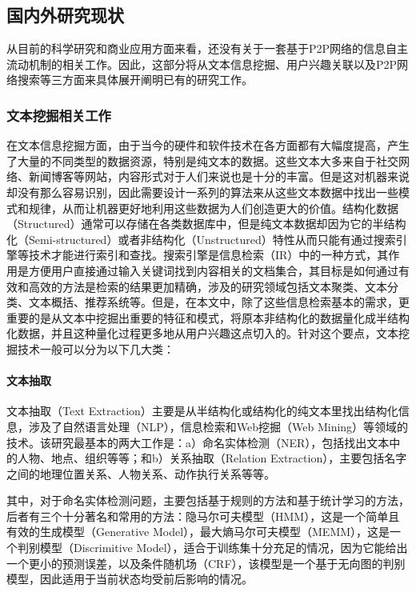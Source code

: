 \subsection{国内外研究现状}
从目前的科学研究和商业应用方面来看，还没有关于一套基于P2P网络的信息自主流动机制的相关工作。因此，这部分将从文本信息挖掘、用户兴趣关联以及P2P网络搜索等三方面来具体展开阐明已有的研究工作。

\subsubsection{文本挖掘相关工作}
在文本信息挖掘方面，由于当今的硬件和软件技术在各方面都有大幅度提高，产生了大量的不同类型的数据资源\cite{han2006data}，特别是纯文本的数据。这些文本大多来自于社交网络、新闻博客等网站，内容形式对于人们来说也是十分的丰富。但是这对机器来说却没有那么容易识别，因此需要设计一系列的算法来从这些文本数据中找出一些模式和规律，从而让机器更好地利用这些数据为人们创造更大的价值。结构化数据（Structured）通常可以存储在各类数据库中，但是纯文本数据却因为它的半结构化（Semi-structured）或者非结构化（Unstructured）特性从而只能有通过搜索引擎等技术才能进行索引和查找\cite{croft2010search}。搜索引擎是信息检索（IR）中的一种方式，其作用是方便用户直接通过输入关键词找到内容相关的文档集合，其目标是如何通过有效和高效的方法是检索的结果更加精确，涉及的研究领域包括文本聚类、文本分类、文本概括、推荐系统等\cite{grossman2004information,manning2008introduction,salton1983introduction}。但是，在本文中，除了这些信息检索基本的需求，更重要的是从文本中挖掘出重要的特征和模式，将原本非结构化的数据量化成半结构化数据，并且这种量化过程更多地从用户兴趣这点切入的。针对这个要点，文本挖掘技术一般可以分为以下几大类：

\paragraph{文本抽取}
文本抽取（Text Extraction）主要是从半结构化或结构化的纯文本里找出结构化信息，涉及了自然语言处理（NLP），信息检索和Web挖掘（Web Mining）等领域的技术。该研究最基本的两大工作是：a）命名实体检测（NER），包括找出文本中的人物、地点、组织等等；和b）关系抽取（Relation Extraction），主要包括名字之间的地理位置关系、人物关系、动作执行关系等等。

其中，对于命名实体检测问题，主要包括基于规则的方法\cite{appelt1993fastus,mooney1999relational}和基于统计学习的方法，后者有三个十分著名和常用的方法：隐马尔可夫模型（HMM）\cite{dugad1996tutorial}，这是一个简单且有效的生成模型（Generative Model），最大熵马尔可夫模型（MEMM）\cite{berger1996maximum}，这是一个判别模型（Discrimitive Model），适合于训练集十分充足的情况，因为它能给出一个更小的预测误差，以及条件随机场（CRF）\cite{lafferty2001conditional}，该模型是一个基于无向图的判别模型，因此适用于当前状态均受前后影响的情况。

